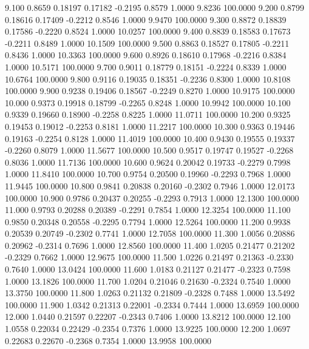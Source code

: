    9.100   0.8659   0.18197   0.17182  -0.2195   0.8579   1.0000   9.8236 100.0000
   9.200   0.8799   0.18616   0.17409  -0.2212   0.8546   1.0000   9.9470 100.0000
   9.300   0.8872   0.18839   0.17586  -0.2220   0.8524   1.0000  10.0257 100.0000
   9.400   0.8839   0.18583   0.17673  -0.2211   0.8489   1.0000  10.1509 100.0000
   9.500   0.8863   0.18527   0.17805  -0.2211   0.8436   1.0000  10.3363 100.0000
   9.600   0.8926   0.18610   0.17968  -0.2216   0.8384   1.0000  10.5171 100.0000
   9.700   0.9011   0.18779   0.18151  -0.2224   0.8339   1.0000  10.6764 100.0000
   9.800   0.9116   0.19035   0.18351  -0.2236   0.8300   1.0000  10.8108 100.0000
   9.900   0.9238   0.19406   0.18567  -0.2249   0.8270   1.0000  10.9175 100.0000
  10.000   0.9373   0.19918   0.18799  -0.2265   0.8248   1.0000  10.9942 100.0000
  10.100   0.9339   0.19660   0.18900  -0.2258   0.8225   1.0000  11.0711 100.0000
  10.200   0.9325   0.19453   0.19012  -0.2253   0.8181   1.0000  11.2217 100.0000
  10.300   0.9363   0.19446   0.19163  -0.2254   0.8128   1.0000  11.4019 100.0000
  10.400   0.9430   0.19555   0.19337  -0.2260   0.8079   1.0000  11.5677 100.0000
  10.500   0.9517   0.19747   0.19527  -0.2268   0.8036   1.0000  11.7136 100.0000
  10.600   0.9624   0.20042   0.19733  -0.2279   0.7998   1.0000  11.8410 100.0000
  10.700   0.9754   0.20500   0.19960  -0.2293   0.7968   1.0000  11.9445 100.0000
  10.800   0.9841   0.20838   0.20160  -0.2302   0.7946   1.0000  12.0173 100.0000
  10.900   0.9786   0.20437   0.20255  -0.2293   0.7913   1.0000  12.1300 100.0000
  11.000   0.9793   0.20288   0.20389  -0.2291   0.7854   1.0000  12.3254 100.0000
  11.100   0.9850   0.20348   0.20558  -0.2295   0.7794   1.0000  12.5264 100.0000
  11.200   0.9938   0.20539   0.20749  -0.2302   0.7741   1.0000  12.7058 100.0000
  11.300   1.0056   0.20886   0.20962  -0.2314   0.7696   1.0000  12.8560 100.0000
  11.400   1.0205   0.21477   0.21202  -0.2329   0.7662   1.0000  12.9675 100.0000
  11.500   1.0226   0.21497   0.21363  -0.2330   0.7640   1.0000  13.0424 100.0000
  11.600   1.0183   0.21127   0.21477  -0.2323   0.7598   1.0000  13.1826 100.0000
  11.700   1.0204   0.21046   0.21630  -0.2324   0.7540   1.0000  13.3750 100.0000
  11.800   1.0263   0.21132   0.21809  -0.2328   0.7488   1.0000  13.5492 100.0000
  11.900   1.0342   0.21313   0.22001  -0.2334   0.7444   1.0000  13.6959 100.0000
  12.000   1.0440   0.21597   0.22207  -0.2343   0.7406   1.0000  13.8212 100.0000
  12.100   1.0558   0.22034   0.22429  -0.2354   0.7376   1.0000  13.9225 100.0000
  12.200   1.0697   0.22683   0.22670  -0.2368   0.7354   1.0000  13.9958 100.0000

